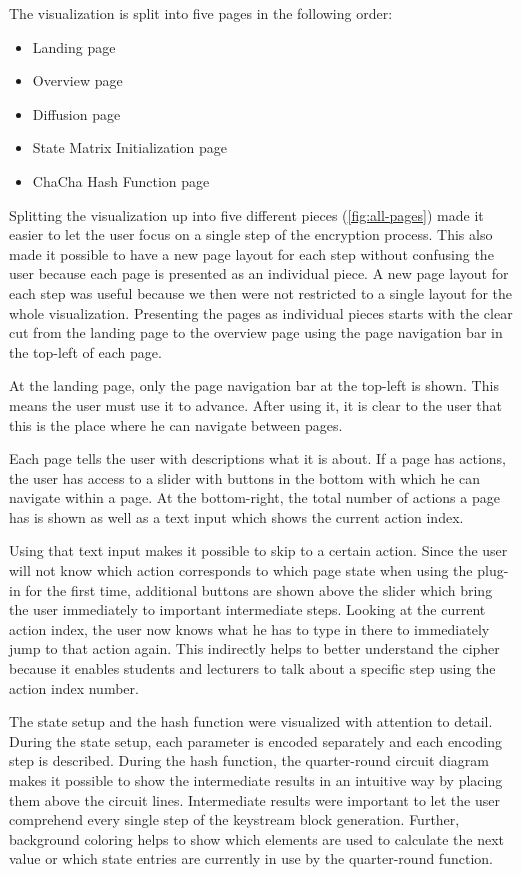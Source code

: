 \begin{enumerate}[label=(\labelenum{G}{{\arabic*}}), wide, labelwidth=!, labelindent=0pt]
     The visualization is split into five pages in the following order:
     \begin{itemize}
     \item Landing page
     \item Overview page
     \item Diffusion page
     \item State Matrix Initialization page
     \item ChaCha Hash Function page
     \end{itemize}
     Splitting the visualization up into five different pieces (\autoref{fig:all-pages}) made it easier to let the user focus on a single step of the encryption process. This also made it possible to have a new page layout for each step without confusing the user because each page is presented as an individual piece. A new page layout for each step was useful because we then were not restricted to a single layout for the whole visualization. Presenting the pages as individual pieces starts with the clear cut from the landing page to the overview page using the page navigation bar in the top-left of each page. 
     
     At the landing page, only the page navigation bar at the top-left is shown. This means the user must use it to advance. After using it, it is clear to the user that this is the place where he can navigate between pages.
     
     Each page tells the user with descriptions what it is about. If a page has actions, the user has access to a slider with buttons in the bottom with which he can navigate within a page. At the bottom-right, the total number of actions a page has is shown as well as a text input which shows the current action index.
     
     Using that text input makes it possible to skip to a certain action. Since the user will not know which action corresponds to which page state when using the plug-in for the first time, additional buttons are shown above the slider which bring the user immediately to important intermediate steps. Looking at the current action index, the user now knows what he has to type in there to immediately jump to that action again. This indirectly helps to better understand the cipher because it enables students and lecturers to talk about a specific step using the action index number.
     
     The state setup and the hash function were visualized with attention to detail. \\
     During the state setup, each parameter is encoded separately and each encoding step is described. During the hash function, the quarter-round circuit diagram makes it possible to show the intermediate results in an intuitive way by placing them above the circuit lines. Intermediate results were important to let the user comprehend every single step of the keystream block generation. Further, background coloring helps to show which elements are used to calculate the next value or which state entries are currently in use by the quarter-round function.
     

\end{enumerate}
